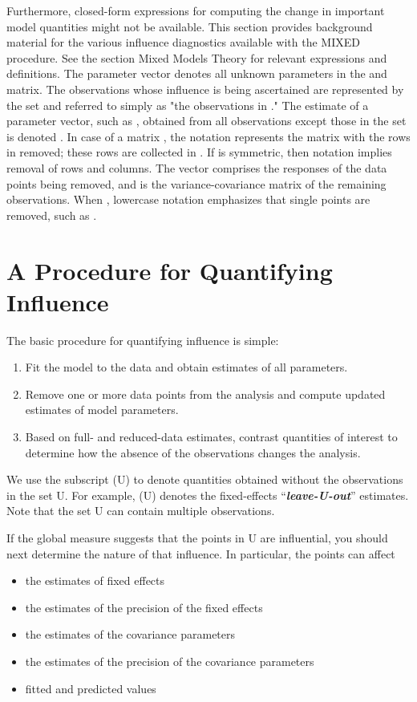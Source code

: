 \documentclass[12pt, a4paper]{report}
\theoremstyle{plain}
\theoremstyle{definition}
\theoremstyle{remark}
\begin{document}
Furthermore, closed-form expressions for computing the change in important model quantities might not be available.
This section provides background material for the various influence diagnostics available with the MIXED procedure. See the section Mixed Models Theory for relevant expressions and definitions. The parameter vector  denotes all unknown parameters in the  and  matrix.
The observations whose influence is being ascertained are represented by the set  and referred to simply as "the observations in ." The estimate of a parameter vector, such as , obtained from all observations except those in the set  is denoted . In case of a matrix , the notation  represents the matrix with the rows in  removed; these rows are collected in . If  is symmetric, then notation  implies removal of rows and columns. The vector  comprises the responses of the data points being removed, and  is the variance-covariance matrix of the remaining observations. When , lowercase notation emphasizes that single points are removed, such as .

\newpage



		\section{A Procedure for Quantifying Influence}  %
		
		
		The basic procedure for quantifying influence is simple:
		
		\begin{enumerate}
			\item Fit the model to the data and obtain estimates of all parameters.
			\item Remove one or more data points from the analysis and compute updated estimates of model parameters.
			\item Based on full- and reduced-data estimates, contrast quantities of interest to determine how the absence
			of the observations changes the analysis.
		\end{enumerate}
		We use the subscript (U) to denote quantities obtained without the observations in the set U. For example,
		(U) denotes the fixed-effects “\textit{\textbf{leave-U-out}}” estimates. Note that the set U can contain multiple observations.
		
		
		If the global measure suggests that the points in U are influential, you should next determine the nature of
		that influence. In particular, the points can affect
		\begin{itemize}
			\item the estimates of fixed effects
			\item the estimates of the precision of the fixed effects
			\item the estimates of the covariance parameters
			\item the estimates of the precision of the covariance parameters
			\item fitted and predicted values
		\end{itemize}
		
\end{document}
